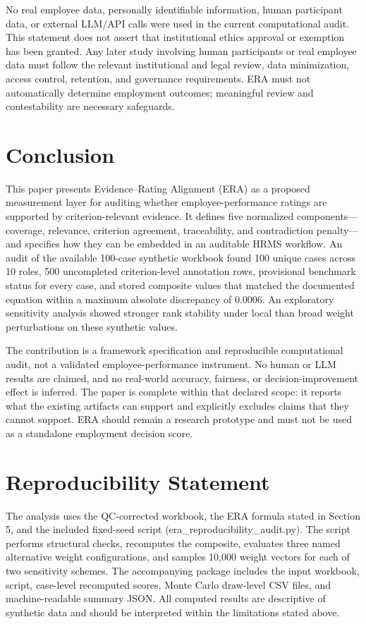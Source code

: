 \documentclass[
  10pt,
  a4paper,
  runningheads]{llncs}
\begin{document}
No real employee data, personally identifiable information, human
participant data, or external LLM/API calls were used in the current
computational audit. This statement does not assert that institutional
ethics approval or exemption has been granted. Any later study involving
human participants or real employee data must follow the relevant
institutional and legal review, data minimization, access control,
retention, and governance requirements. ERA must not automatically
determine employment outcomes; meaningful review and contestability are
necessary safeguards.

\section{Conclusion}\label{conclusion}

This paper presents Evidence--Rating Alignment (ERA) as a proposed
measurement layer for auditing whether employee-performance ratings are
supported by criterion-relevant evidence. It defines five normalized
components---coverage, relevance, criterion agreement, traceability, and
contradiction penalty---and specifies how they can be embedded in an
auditable HRMS workflow. An audit of the available 100-case synthetic
workbook found 100 unique cases across 10 roles, 500 uncompleted
criterion-level annotation rows, provisional benchmark status for every
case, and stored composite values that matched the documented equation
within a maximum absolute discrepancy of 0.0006. An exploratory
sensitivity analysis showed stronger rank stability under local than
broad weight perturbations on these synthetic values.

The contribution is a framework specification and reproducible
computational audit, not a validated employee-performance instrument. No
human or LLM results are claimed, and no real-world accuracy, fairness,
or decision-improvement effect is inferred. The paper is complete within
that declared scope: it reports what the existing artifacts can support
and explicitly excludes claims that they cannot support. ERA should
remain a research prototype and must not be used as a standalone
employment decision score.

\section{Reproducibility Statement}\label{reproducibility-statement}

The analysis uses the QC-corrected workbook, the ERA formula stated in
Section 5, and the included fixed-seed script
(era_reproducibility_audit.py). The script performs structural checks,
recomputes the composite, evaluates three named alternative weight
configurations, and samples 10,000 weight vectors for each of two
sensitivity schemes. The accompanying package includes the input
workbook, script, case-level recomputed scores, Monte Carlo draw-level
CSV files, and machine-readable summary JSON. All computed
results are descriptive of synthetic data and should be interpreted
within the limitations stated above.
\end{document}
